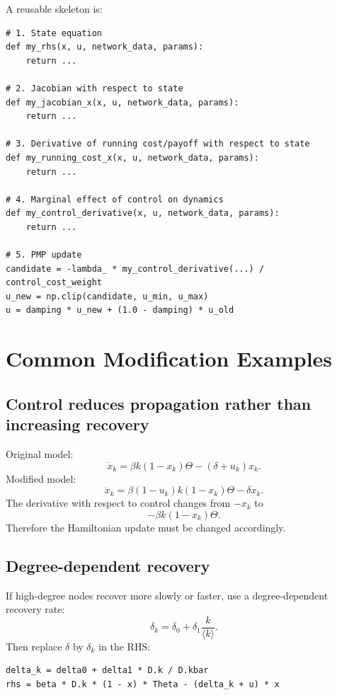\documentclass[11pt,a4paper]{article}
\begin{document}
A reusable skeleton is:

\begin{lstlisting}[style=py]
# 1. State equation
def my_rhs(x, u, network_data, params):
    return ...

# 2. Jacobian with respect to state
def my_jacobian_x(x, u, network_data, params):
    return ...

# 3. Derivative of running cost/payoff with respect to state
def my_running_cost_x(x, u, network_data, params):
    return ...

# 4. Marginal effect of control on dynamics
def my_control_derivative(x, u, network_data, params):
    return ...

# 5. PMP update
candidate = -lambda_ * my_control_derivative(...) / control_cost_weight
u_new = np.clip(candidate, u_min, u_max)
u = damping * u_new + (1.0 - damping) * u_old
\end{lstlisting}

\section{Common Modification Examples}

\subsection{Control reduces propagation rather than increasing recovery}

Original model:
\[
  \dot{x}_k=\beta k(1-x_k)\Theta-(\delta+u_k)x_k.
\]
Modified model:
\[
  \dot{x}_k=\beta(1-u_k)k(1-x_k)\Theta-\delta x_k.
\]
The derivative with respect to control changes from \(-x_k\) to
\[
  -\beta k(1-x_k)\Theta.
\]
Therefore the Hamiltonian update must be changed accordingly.

\subsection{Degree-dependent recovery}

If high-degree nodes recover more slowly or faster, use a degree-dependent recovery rate:
\[
  \delta_k=\delta_0+\delta_1\frac{k}{\langle k\rangle}.
\]
Then replace \(\delta\) by \(\delta_k\) in the RHS:

\begin{lstlisting}[style=py]
delta_k = delta0 + delta1 * D.k / D.kbar
rhs = beta * D.k * (1 - x) * Theta - (delta_k + u) * x
\end{lstlisting}
\end{document}
